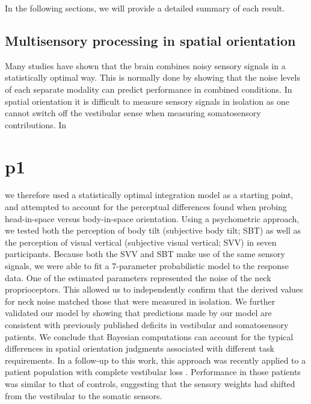 In the following sections, we will provide a detailed summary of each result. 

\section{Multisensory processing in spatial orientation}
Many studies have shown that the brain combines noisy sensory signals in a statistically optimal way. This is normally done by showing that the noise levels of each separate modality can predict performance in combined conditions. In spatial orientation it is difficult to measure sensory signals in isolation as one cannot switch off the vestibular sense when measuring somatosensory contributions. In \chapter{p1} we therefore used a statistically optimal integration model as a starting point, and attempted to account for the perceptual differences found when probing head-in-space versus body-in-space orientation. Using a psychometric approach, we tested both the perception of body tilt (subjective body tilt; SBT) as well as the perception of visual vertical (subjective visual vertical; SVV) in seven participants. Because both the SVV and SBT make use of the same sensory signals, we were able to fit a 7-parameter probabilistic model to the response data.  One  of the estimated parameters represented the noise of the neck proprioceptors. This allowed us to independently confirm that the derived values for neck noise matched those that were measured in isolation. We further validated our model by showing that predictions made by our model are consistent with previously published deficits in vestibular and somatosensory patients. We conclude that Bayesian computations can account for the typical differences in spatial orientation judgments associated with different task requirements. In a follow-up to this work, this approach was recently applied to a patient population with complete  vestibular loss \cite{alberts2015}. Performance in those patients was similar to that of controls, suggesting that the sensory weights had shifted from the vestibular to the somatic sensors.

